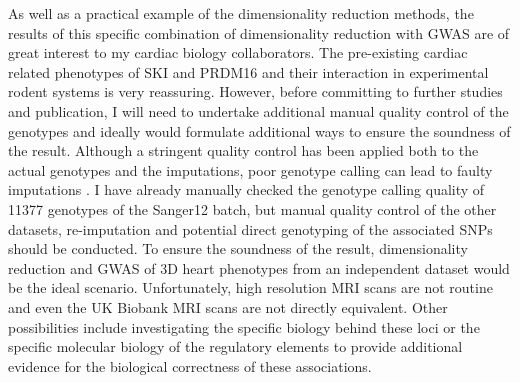 As well as a practical example of the dimensionality reduction methods, the results of this specific combination of dimensionality reduction with GWAS are of great interest to my cardiac biology collaborators. The pre-existing cardiac related phenotypes of SKI and PRDM16 and their interaction in experimental rodent systems is very reassuring. However, before committing to further studies and publication, I will need to undertake additional manual quality control of the genotypes and ideally would formulate additional ways to ensure the soundness of the result. Although a stringent quality control has been applied both to the actual genotypes and the imputations, poor genotype calling can lead to faulty imputations \citep{Morris2010}. I have already manually checked the genotype calling quality of \num{11377} genotypes of the Sanger12 batch, but manual quality control of the other datasets, re-imputation and potential direct genotyping of the associated SNPs should be conducted. To ensure the soundness of the result, dimensionality reduction and GWAS of 3D heart phenotypes from an independent dataset would be the ideal scenario. Unfortunately, high resolution MRI scans are not routine and even the UK Biobank MRI scans are not directly equivalent. Other possibilities include investigating the specific biology behind these loci or the specific molecular biology of the regulatory elements to provide additional evidence for the biological correctness of these associations.

